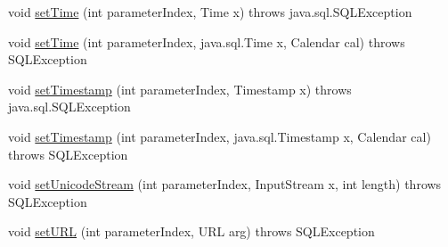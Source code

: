 \begin{DoxyCompactItemize}
\item 
void \mbox{\hyperlink{classcom_1_1mysql_1_1cj_1_1jdbc_1_1_client_prepared_statement_af9130888af4f80965d74ca5617cd374c}{set\+Time}} (int parameter\+Index, Time x)  throws java.\+sql.\+S\+Q\+L\+Exception 
\item 
void \mbox{\hyperlink{classcom_1_1mysql_1_1cj_1_1jdbc_1_1_client_prepared_statement_a9cc08b12315d4c502e3fae7692e6af47}{set\+Time}} (int parameter\+Index, java.\+sql.\+Time x, Calendar cal)  throws S\+Q\+L\+Exception 
\item 
void \mbox{\hyperlink{classcom_1_1mysql_1_1cj_1_1jdbc_1_1_client_prepared_statement_a34d40f7444292106d7853d49ad2eb5af}{set\+Timestamp}} (int parameter\+Index, Timestamp x)  throws java.\+sql.\+S\+Q\+L\+Exception 
\item 
void \mbox{\hyperlink{classcom_1_1mysql_1_1cj_1_1jdbc_1_1_client_prepared_statement_a79b4a88871939c15a8425dc0a40304ef}{set\+Timestamp}} (int parameter\+Index, java.\+sql.\+Timestamp x, Calendar cal)  throws S\+Q\+L\+Exception 
\item 
void \mbox{\hyperlink{classcom_1_1mysql_1_1cj_1_1jdbc_1_1_client_prepared_statement_a5548cb04b0d38d6af22ad76fa774cf56}{set\+Unicode\+Stream}} (int parameter\+Index, Input\+Stream x, int length)  throws S\+Q\+L\+Exception 
\item 
void \mbox{\hyperlink{classcom_1_1mysql_1_1cj_1_1jdbc_1_1_client_prepared_statement_a5f83d136ca933d21967fae30a75a5430}{set\+U\+RL}} (int parameter\+Index, U\+RL arg)  throws S\+Q\+L\+Exception 
\end{DoxyCompactItemize}
